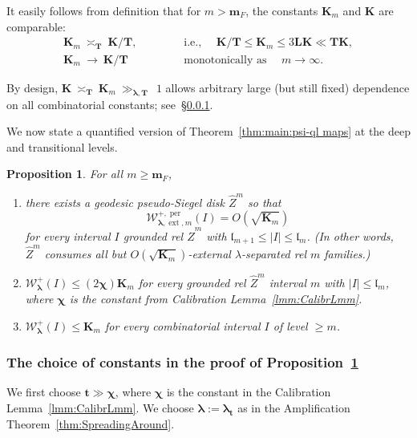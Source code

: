 \documentclass{amsart}
\newcommand{\1}{{\mathbb 1 }}
\newcommand{\blambda}{{\boldsymbol\lambda}}
\newcommand{\ext}{{\operatorname{ext}}}
\newcommand{\Width}{{\mathcal W}}
\newcommand{\wZ}{{\widehat Z}}
\newcommand{\bL}{{\mathbf L}}
\newcommand{\bT}{{\mathbf T}}
\newcommand{\bK}{{\mathbf K}}
\newcommand{\bbm}{{\mathbf m}}
\newcommand{\bbt}{{\mathbf t}}
\newcommand{\length}{{\mathfrak l}}
\newcommand\per{{\operatorname{per}}}
\newtheorem{prop}[thm]{Proposition}
\theoremstyle{remark}
\numberwithin{equation}{section}
\theoremstyle{definition}
\newcommand{\bchi}{{\boldsymbol{ \chi}}}
\begin{document}
It easily follows from definition that for $m> \bbm_F$, the constants $\bK_m$ and $\bK$ are comparable:
\begin{equation}
\label{eq:bK_vs_bK_m}
   \begin{matrix} \bK_m\ \asymp _{\bT} \  \bK/\bT ,\qquad \quad& \text{ i.e., }\quad \bK/\bT \le  \bK_m \le 3\bL \bK \ll \bT \bK,\\ \bK_m\ \to \ \bK/\bT \qquad\quad & \text{ monotonically as }\quad m\to \infty.\end{matrix}
\end{equation}

By design, $\bK\ \asymp_\bT\ \bK_m\ \gg_{\blambda, \bT}\ \  1$ allows arbitrary large (but still fixed)  dependence on all combinatorial constants; see~\S\ref{sss:choice of constants}. 

We now state a quantified version of Theorem~\ref{thm:main:psi-ql maps} at the deep and transitional levels.
\begin{prop}\label{prop:deepandtransitional}
For all $m \geq \bbm_F$,
\begin{enumerate}[label=\text{(\alph*)},font=\normalfont,leftmargin=*]
\item there exists a geodesic pseudo-Siegel disk $\wZ^m$ so that
\[\Width^{+, \per}_{\blambda,\ext, m} (I) =O(\sqrt{\bK_m})\]
for every interval $I$ grounded rel $\wZ^m$ with $\length_{m+1}\le |I|\le \length_m$. (In other words, $\wZ^m$ consumes all but $O(\sqrt{\bK_m})$-external $\lambda$-separated rel $m$ families.)
\label{eq:case1:main prf}
\item $\Width_\blambda^+(I)\le (2\bchi)\bK_m$ for every grounded rel $\wZ^m$ interval $m$ with $|I|\le \length_m$, where $\bchi$ is the constant from Calibration Lemma~\ref{lmm:CalibrLmm}.\label{eq:case2:main prf}
\item $\Width_\blambda^+(I)\le  \bK_m$ for every combinatorial interval $I$ of level $\ge m$.\label{eq:case3:main prf}
\end{enumerate}
\end{prop}


\subsubsection{The choice of constants in the proof of Proposition~\ref{prop:deepandtransitional}} \label{sss:choice of constants}
We first choose $\bbt \gg \bchi$, where $\bchi$ is the constant in the Calibration Lemma~\ref{lmm:CalibrLmm}. We choose $\blambda := \blambda_{\bbt}$ as in the Amplification Theorem~\ref{thm:SpreadingAround}. 
\end{document}
